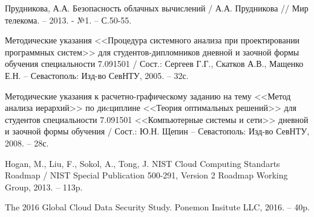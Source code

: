 \begingroup 
\renewcommand{\section}[2]{\anonsection{Библиографический список}}
\begin{thebibliography}{00}

    Прудникова, А.А.
    Безопасность облачных вычислений /
    А.А. Прудникова //
    Мир телекома. -- 2013. - №1.
    -- С.50-55.

    Методические указания <<Процедура системного анализа при проектировании программных систем>>
    для студентов-дипломников дневной и заочной формы обучения специальности 7.091501 /
    Сост.: Сергеев Г.Г., Скатков А.В., Мащенко Е.Н. -- Севастополь:
    Изд-во СевНТУ, 2005. -- 32с.

    Методические указания к расчетно-графическому заданию
    на тему <<Метод анализа иерархий>>  по диcциплине <<Теория оптимальных решений>>
    для студентов специальности 7.091501 <<Компьютерные системы и сети>>
    дневной и заочной формы обучения /
    Сост.: Ю.Н. Щепин -- Севастополь:
    Изд-во СевНТУ, 2008. -- 28с.

    Hogan, M., Liu, F., Sokol, A., Tong, J.
    NIST Cloud Computing Standarts Roadmap /
    NIST Special Publication 500-291, Version 2
    Roadmap Working Group, 2013. -- 113p.

    The 2016 Global Cloud Data Security Study.
    Ponemon Insitute LLC, 2016. -- 40p.

\end{thebibliography}
\endgroup

\clearpage
